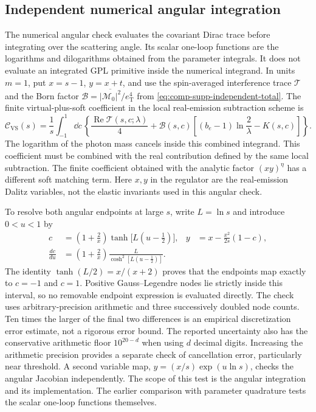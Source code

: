 \subsection{Independent numerical angular integration}
The numerical angular check evaluates the covariant Dirac trace before
integrating over the scattering angle.  Its scalar one-loop functions are
the logarithms and dilogarithms obtained from the parameter integrals.
It does not evaluate an integrated GPL primitive inside the numerical
integrand. In units $m=1$, put $x=s-1$, $y=x+t$, and use the
spin-averaged interference trace $\mathcal T$ and the Born factor
$\mathcal B=\overline{|\mathcal M_0|^2}/e_{\mathrm T}^4$ from
\eqref{eq:comp-supp-independent-total}.
The finite virtual-plus-soft coefficient in the local real-emission
subtraction scheme is
\begin{equation}
 \mathcal C_{\mathrm{VS}}(s)=\frac{1}{s}\int_{-1}^{1}\dd c\,
 \left\{\frac{\operatorname{Re}\mathcal T(s,c;\lambda)}4
 +\mathcal B(s,c)\left[(b_e-1)\ln\frac2\lambda-K(s,c)\right]\right\}.
\end{equation}
The logarithm of the photon mass cancels inside this combined integrand.
This coefficient must be combined with the real contribution defined by
the same local subtraction.  The finite coefficient obtained with the
analytic factor $(xy)^\eta$ has a different soft matching term. Here
$x,y$ in the regulator are the real-emission Dalitz variables, not the
elastic invariants used in this angular check.

To resolve both angular endpoints at large $s$, write $L=\ln s$ and
introduce $0<u<1$ by
\begin{align}
 c&=\left(1+\frac2x\right)\tanh\bigl[L(u-\tfrac12)\bigr],
 &y&=x-\frac{x^2}{2s}(1-c),\\
 \frac{dc}{du}&=\left(1+\frac2x\right)
 \frac{L}{\cosh^2[L(u-\tfrac12)]}.
\end{align}
The identity $\tanh(L/2)=x/(x+2)$ proves that the endpoints map exactly
to $c=-1$ and $c=1$.  Positive Gauss--Legendre nodes lie strictly inside
this interval, so no removable endpoint expression is evaluated directly.
The check uses arbitrary-precision arithmetic and three successively
doubled node counts.  Ten times the larger of the final two differences
is an empirical discretization error estimate, not a rigorous error bound.
The reported uncertainty also has the conservative arithmetic floor
$10^{20-d}$ when using $d$ decimal digits.
Increasing the arithmetic precision provides a separate check of
cancellation error, particularly near threshold.  A second variable map,
$y=(x/s)\exp(u\ln s)$, checks the angular Jacobian independently.
The scope of this test is the angular integration and its implementation.
The earlier comparison with parameter quadrature tests the scalar
one-loop functions themselves.

